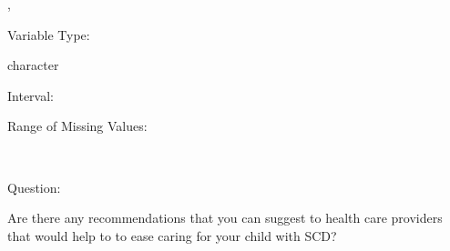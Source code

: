 \documentclass[
]{article}
\begin{document}
,

\begin{minipage}[t]{0.3\linewidth}

\colorbox{mypink1}{}

\end{minipage}%
\begin{minipage}[t]{0.7\linewidth}

\colorbox{mypink1}{\makebox[\textwidth]{\strut\bfseries\color{black}  
 }}

\end{minipage}

\begin{minipage}[t]{0.3\linewidth}

Variable Type:

\end{minipage}%
\begin{minipage}[t]{0.7\linewidth}

character

\end{minipage}

\begin{minipage}[t]{0.3\linewidth}

Interval:

\end{minipage}%
\begin{minipage}[t]{0.7\linewidth}

\end{minipage}

\begin{minipage}[t]{0.3\linewidth}

Range of Missing Values:

\end{minipage}%
\begin{minipage}[t]{0.7\linewidth}

~

\end{minipage}

\begin{minipage}[t]{0.3\linewidth}

Question:

\end{minipage}%
\begin{minipage}[t]{0.7\linewidth}

Are there any recommendations that you can suggest to health care
providers that would help to to ease caring for your child with SCD?

\end{minipage}
\end{document}
